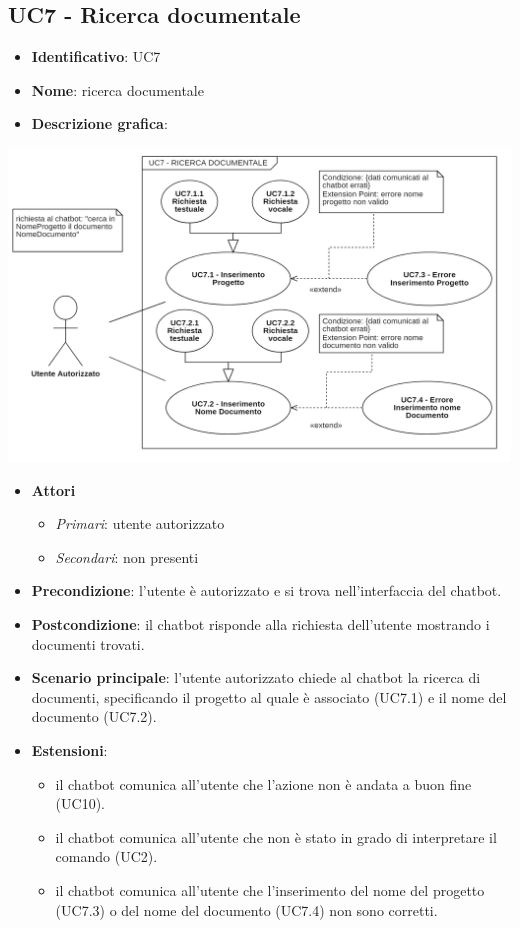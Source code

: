 \subsection{UC7 - Ricerca documentale}
\begin{itemize}
    \item \textbf{Identificativo}: UC7
    \item \textbf{Nome}: ricerca documentale
    \item \textbf{Descrizione grafica}:
\end{itemize}
\begin{center}
    \includegraphics{images/UC7.png} 
\end{center}
 \begin{itemize}
    \item \textbf{Attori}
 \begin{itemize} 
    \item \textit{Primari}: utente autorizzato
    \item \textit{Secondari}: non presenti
 \end{itemize}
 \item \textbf{Precondizione}: l'utente è autorizzato e si trova nell'interfaccia del chatbot.
 \item \textbf{Postcondizione}: il chatbot risponde alla richiesta dell'utente mostrando i documenti trovati.
 \item \textbf{Scenario principale}: l'utente autorizzato chiede al chatbot la ricerca di documenti, specificando il progetto al quale è associato (UC7.1) e il nome del documento (UC7.2).
 \item \textbf{Estensioni}: 
 \begin{itemize} 
    \item il chatbot comunica all'utente che l'azione non è andata a buon fine (UC10).
    \item il chatbot comunica all'utente che non è stato in grado di interpretare il comando (UC2).
    \item il chatbot comunica all'utente che l'inserimento del nome del progetto (UC7.3) o del nome del documento (UC7.4) non sono corretti.
 \end{itemize}
\end{itemize}
\newpage
